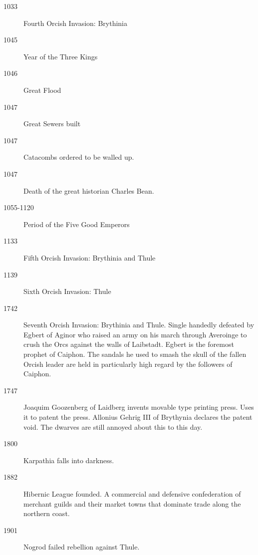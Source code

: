 \documentclass[a4paper]{dnd5}
\begin{document}
\begin{description}
  \item[1033] Fourth Orcish Invasion: Brythinia
  \item[1045] Year of the Three Kings
  \item[1046] Great Flood
  \item[1047] Great Sewers built
  \item[1047] Catacombs ordered to be walled up.
  \item[1047] Death of the great historian Charles Bean. 
  \item[1055-1120] Period of the Five Good Emperors
  \item[1133] Fifth Orcish Invasion: Brythinia and Thule
  \item[1139] Sixth Orcish Invasion: Thule

  \item[1742] Seventh Orcish Invasion: Brythinia and Thule.  Single handedly defeated by Egbert of Aginor who raised an army on his march through Averoinge to crush the Orcs against the walls of Laibstadt.  Egbert is the foremost prophet of Caiphon.  The sandals he used to smash the skull of the fallen Orcish leader are held in particularly high regard by the followers of Caiphon.

  \item[1747] Joaquim Goozenberg of Laidberg invents movable type printing press.  Uses it to patent the press.  Allonius Gehrig III of Brythynia declares the patent void.  The dwarves are still annoyed about this to this day.    

  \item[1800] Karpathia falls into darkness.

  \item[1882] Hibernic League founded.  A commercial and defensive confederation of 
    merchant guilds and their market towns that dominate trade along the northern coast. 

  \item[1901] Nogrod failed rebellion against Thule.






\end{description}
\end{document}
